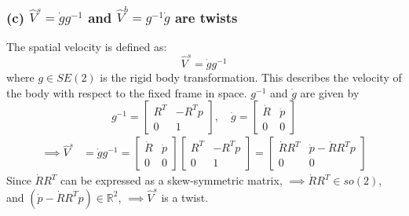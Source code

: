 \clearpage
\subsubsection*{(c) \( \hat{V}^{s} = \dot{g} g^{-1} \) and \( \hat{V}^{b} = g^{-1} \dot{g} \) are twists}

The spatial velocity is defined as:
\[
    \hat{V}^{s} = \dot{g} g^{-1}
\]
where \( g \in SE(2) \) is the rigid body transformation.
This describes the velocity of the body with respect to the fixed frame in space.
\( g^{-1} \) and \( \dot g \) are given by
\begin{equation*}
    g^{-1} = \begin{bmatrix}
        R^T & -R^T p \\
        0   & 1
    \end{bmatrix},
    \quad
    \dot{g} = \begin{bmatrix}
        \dot R & \dot p \\
        0      & 0
    \end{bmatrix}
\end{equation*}
\begin{align*}
    \implies
    \hat{V}^{s}
     & =
    \dot{g} g^{-1}
    =
    \begin{bmatrix}
        \dot R & \dot p \\
        0      & 0
    \end{bmatrix}
    \begin{bmatrix}
        R^T & -R^T p \\
        0   & 1
    \end{bmatrix}
    =
    \begin{bmatrix}
        \dot R R^T & \dot p - \dot R R^T p \\
        0          & 0
    \end{bmatrix}
\end{align*}
Since \( \dot R R^T \) can be expressed as a skew-symmetric matrix, \( \implies \dot R R^T \in so(2) \),\\
and \( (\dot p - \dot R R^T p) \in \mathbb{R}^2 \), \( \implies \hat{V}^{s} \) is a twist.


